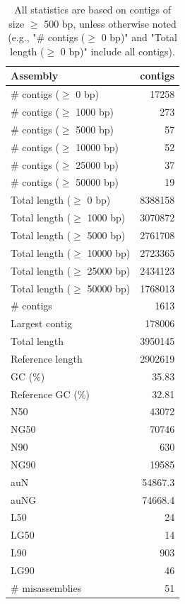 \documentclass[12pt,a4paper]{article}
\begin{document}
\begin{table}[ht]
\begin{center}
\caption{All statistics are based on contigs of size $\geq$ 500 bp, unless otherwise noted (e.g., "\# contigs ($\geq$ 0 bp)" and "Total length ($\geq$ 0 bp)" include all contigs).}
\begin{tabular}{|l*{1}{|r}|}
\hline
Assembly & contigs \\ \hline
\# contigs ($\geq$ 0 bp) & 17258 \\ \hline
\# contigs ($\geq$ 1000 bp) & 273 \\ \hline
\# contigs ($\geq$ 5000 bp) & 57 \\ \hline
\# contigs ($\geq$ 10000 bp) & 52 \\ \hline
\# contigs ($\geq$ 25000 bp) & 37 \\ \hline
\# contigs ($\geq$ 50000 bp) & 19 \\ \hline
Total length ($\geq$ 0 bp) & 8388158 \\ \hline
Total length ($\geq$ 1000 bp) & 3070872 \\ \hline
Total length ($\geq$ 5000 bp) & 2761708 \\ \hline
Total length ($\geq$ 10000 bp) & 2723365 \\ \hline
Total length ($\geq$ 25000 bp) & 2434123 \\ \hline
Total length ($\geq$ 50000 bp) & 1768013 \\ \hline
\# contigs & 1613 \\ \hline
Largest contig & 178006 \\ \hline
Total length & 3950145 \\ \hline
Reference length & 2902619 \\ \hline
GC (\%) & 35.83 \\ \hline
Reference GC (\%) & 32.81 \\ \hline
N50 & 43072 \\ \hline
NG50 & 70746 \\ \hline
N90 & 630 \\ \hline
NG90 & 19585 \\ \hline
auN & 54867.3 \\ \hline
auNG & 74668.4 \\ \hline
L50 & 24 \\ \hline
LG50 & 14 \\ \hline
L90 & 903 \\ \hline
LG90 & 46 \\ \hline
\# misassemblies & 51 \\ \hline

\end{tabular}
\end{center}
\end{table}
\end{document}
